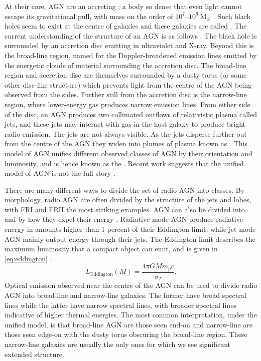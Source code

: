         At their core, AGN are an accreting : a body so dense that even light cannot escape its gravitational pull, with mass on the order of $10^7$--$10^9\ \mathrm{M}_\odot$ \citeneeded{}. Such black holes seem to exist at the centre of galaxies\citeneeded{} and these galaxies are called . The current understanding of the structure of an AGN is as follows \citep{urry_unified_1995}. The black hole is surrounded by an accretion disc emitting in ultraviolet and X-ray. Beyond this is the broad-line region, named for the Doppler-broadened emission lines emitted by the energetic clouds of material surrounding the accretion disc. The broad-line region and accretion disc are themselves surrounded by a dusty torus (or some other disc-like structure) which prevents light from the centre of the AGN being observed from the sides. Further still from the accretion disc is the narrow-line region, where lower-energy gas produces narrow emission lines. From either side of the disc, an AGN produces two collimated outflows of relativistic plasma called {jets}, and these jets may interact with gas in the host galaxy to produce bright radio emission. The jets are not always visible. As the jets disperse further out from the centre of the AGN they widen into plumes of plasma known as . This model of AGN unifies different observed classes of AGN by their orientation and luminosity, and is hence known as the  \citep{antonucci_unified_1993}. Recent work suggests that the unified model of AGN is not the full story \citep[e.g.][]{zhuang_interplay_2020}.

        There are many different ways to divide the set of radio AGN into classes. By morphology, radio AGN are often divided by the structure of the jets and lobes, with FRI and FRII the most striking examples. AGN can also be divided into  and  by how they expel their energy \citep{heckman_coevolution_2014}. Radiative-mode AGN produce radiative energy in amounts higher than 1 percent of their Eddington limit, while jet-mode AGN mainly output energy through their jets. The Eddington limit describes the maximum luminosity that a compact object can emit, and is given in \autoref{eq:eddington} \citep{rybicki_radiative_1979}:
        \begin{equation}
            L_{\mathrm{Eddington}}(M) = \frac{4\pi G M m_p c}{\sigma_T}.
            \label{eq:eddington}
        \end{equation}
        Optical emission observed near the centre of the AGN can be used to divide radio AGN into broad-line and narrow-line galaxies. The former have broad spectral lines while the latter have narrow spectral lines, with broader spectral lines indicative of higher thermal energies. The most common interpretation, under the unified model, is that broad-line AGN are those seen end-on and narrow-line are those seen edge-on with the dusty torus obscuring the broad-line region. These narrow-line galaxies are usually the only ones for which we see significant extended structure.

